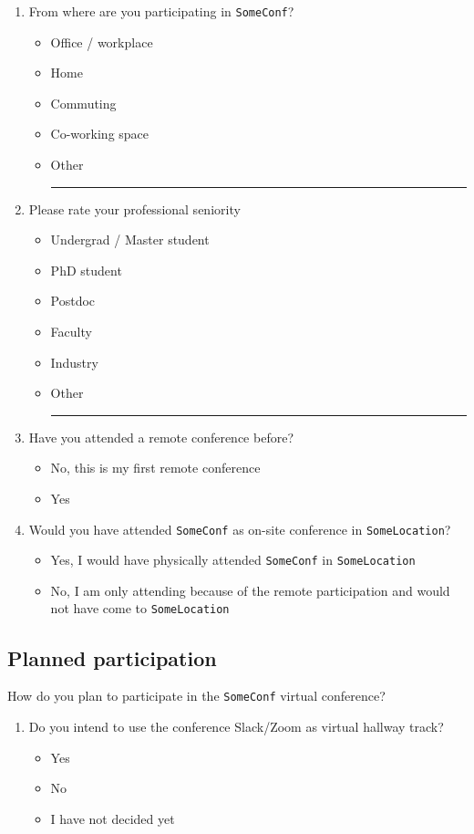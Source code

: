 \documentclass[sigconf]{acmart}
\newcommand{\confname}[0]{\texttt{SomeConf}\xspace}
\newcommand{\confloc}[0]{\texttt{SomeLocation}\xspace}
\newcommand{\QO}{$\Box$}%
\newenvironment{Qlist}{%
\renewcommand{\labelitemi}{\QO}
\begin{itemize}[leftmargin=1.5em,topsep=-.5em]
}{%
\end{itemize}
}
\newcommand{\Qline}[1]{\noindent\rule{#1}{0.6pt}}
\begin{document}
\begin{appendix}
\begin{enumerate}
	\item From where are you participating in \confname?
		\begin{Qlist}
			\item Office / workplace
			\item Home
			\item Commuting
			\item Co-working space
			\item Other \Qline{3cm}
		\end{Qlist}

	\item Please rate your professional seniority
		\begin{Qlist}
			\item Undergrad / Master student
			\item PhD student
			\item Postdoc
			\item Faculty
			\item Industry
			\item Other \Qline{3cm}
		\end{Qlist}

	\item Have you attended a remote conference before?
		\begin{Qlist}
			\item No, this is my first remote conference
			\item Yes
		\end{Qlist}

	\item Would you have attended \confname as on-site conference in \confloc?
		\begin{Qlist}
			\item Yes, I would have physically attended \confname in \confloc
			\item No, I am only attending because of the remote participation and would not have come to \confloc
		\end{Qlist}

\setcounter{preConfCounter}{\value{enumi}}
\end{enumerate}

\subsection{Planned participation}
How do you plan to participate in the \confname virtual conference?

\begin{enumerate}
\setcounter{enumi}{\value{preConfCounter}}
	\item Do you intend to use the conference Slack/Zoom as virtual hallway track?
		\begin{Qlist}
			\item Yes
			\item No
			\item I have not decided yet
		\end{Qlist}


\end{enumerate}
\end{appendix}
\end{document}
